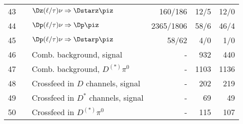 \documentclass[6pt]{article}
\begin{document}
\begin{tabular}{r l l r r r}
43  &       & $\Dz(\ell/\tau)\nu\Rightarrow\Dstarz\piz$              &  160/186	     & 12/5     & 12/0      \\
44  &       & $\Dp(\ell/\tau)\nu\Rightarrow\Dp\piz$                  &  2365/1806    & 58/6     & 46/4      \\
45  &       & $\Dp(\ell/\tau)\nu\Rightarrow\Dstarp\piz$              &  58/62        & 4/0      & 1/0       \\\hline 
46  &       & Comb. background, signal                               &  -            &   932    & 440   \\
47  &       & Comb. background, $D^{(*)}\pi^0$                       &  -            &   1103   & 1136   \\
48  &       & Crossfeed in $D$ channels, signal                      &  -            &   202    & 219   \\
49  &       & Crossfeed in $D^*$ channels, signal                    &  -            &   69     & 49   \\
50  &       & Crossfeed in $D^{(*)}\pi^0$                            &  -            &   115    & 107   \\ \hline\hline                
\end{tabular}
\end{document}
